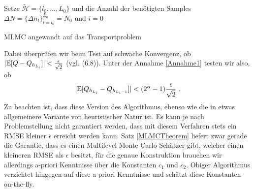  \begin{algorithm}[H]
 	\DontPrintSemicolon
 	\SetAlgoLined
 	\BlankLine
 	
 	Setze $ \tilde{\mathcal{H}} = \{ l_0,\dots,L_0 \} $ und die Anzahl der benötigten Samples $ \Delta N = \{ \Delta n_l \}_{l=l_0}^{L_0} = N_0$ und $ i = 0 $\;
 	\BlankLine
 	\caption{MLMC angewandt auf das Transportproblem}
 \end{algorithm}
\bigskip %
Dabei überprüfen wir beim Test auf schwache Konvergenz, ob $ | \mathbb{E}[Q-Q_{h_{L_i}}] | < \frac{\epsilon}{\sqrt{2}}$ (vgl. (6.8)).
Unter der Annahme \ref{Annahme1} testen wir also, ob
\[
	| \mathbb{E}[Q_{h_{L_{i}}}-Q_{h_{L_{i}-1}}] | < (2^{\alpha}-1)\frac{\epsilon}{\sqrt{2}} \ . 
\]
Zu beachten ist, dass diese Version des Algorithmus, ebenso wie die in \cite{giles_2015} etwas allgemeinere Variante von heuristischer Natur ist. Es kann je nach Problemstellung nicht garantiert werden, dass mit diesem Verfahren stets ein RMSE kleiner $ \epsilon $ erreicht werden kann.
Satz \ref{MLMCTheorem} liefert zwar gerade die Garantie, dass es einen Multilevel Monte Carlo Schätzer gibt, welcher einen kleineren RMSE als $ \epsilon $ besitzt, für die genaue Konstruktion brauchen wir allerdings a-priori Kenntnisse über die Konstanten $ c_1 $ und $ c_2 $. Obiger Algorithmus verzichtet hingegen auf diese a-priori Kenntnisse und schätzt diese Konstanten on-the-fly.
